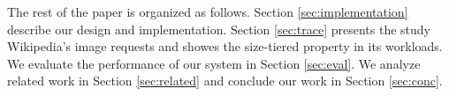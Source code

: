 

The rest of the paper is organized as follows. Section
\ref{sec:implementation} describe our design and implementation.
Section \ref{sec:trace} presents the study Wikipedia's image requests
and showes the size-tiered property in its workloads.  We evaluate the
performance of our system in Section \ref{sec:eval}. We analyze
related work in Section \ref{sec:related} and conclude our work in
Section \ref{sec:conc}.

